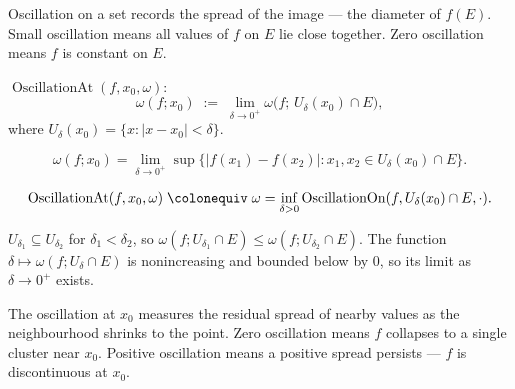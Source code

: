 \begin{remark*}[Interpretation]
Oscillation on a set records the spread of the image — the diameter
of $f(E)$. Small oscillation means all values of $f$ on $E$ lie
close together. Zero oscillation means $f$ is constant on $E$.
\end{remark*}


\begin{tcolorbox}[title={Definition --- Oscillation at a Point}]
\begin{definition}
\label{def:oscillation-at-a-point}
$\operatorname{OscillationAt}(f,x_0,\omega)$:
\[
  \omega(f;x_0) \;:=\;
  \lim_{\delta\to 0^+}
  \omega\bigl(f;\,U_\delta(x_0)\cap E\bigr),
\]
where $U_\delta(x_0)=\{x:|x-x_0|<\delta\}$.
\end{definition}
\end{tcolorbox}

\begin{remark*}
\[
  \omega(f;x_0)
  = \lim_{\delta\to 0^+}
    \sup\bigl\{|f(x_1)-f(x_2)|:x_1,x_2\in U_\delta(x_0)\cap E\bigr\}.
\]
\end{remark*}

\begin{remark*}
\[
  \operatorname{OscillationAt}(f,x_0,\omega)
  \;\colonequiv\;
  \omega = \inf_{\delta>0}\operatorname{OscillationOn}(f,U_\delta(x_0)\cap E,\cdot).
\]
\end{remark*}

\begin{remark*}
$U_{\delta_1}\subseteq U_{\delta_2}$ for $\delta_1<\delta_2$, so
$\omega(f;U_{\delta_1}\cap E)\leq\omega(f;U_{\delta_2}\cap E)$.
The function $\delta\mapsto\omega(f;U_\delta\cap E)$ is nonincreasing
and bounded below by $0$, so its limit as $\delta\to 0^+$ exists.
\end{remark*}

\begin{remark*}[Interpretation]
The oscillation at $x_0$ measures the residual spread of nearby
values as the neighbourhood shrinks to the point. Zero oscillation
means $f$ collapses to a single cluster near $x_0$. Positive
oscillation means a positive spread persists — $f$ is discontinuous
at $x_0$.
\end{remark*}

